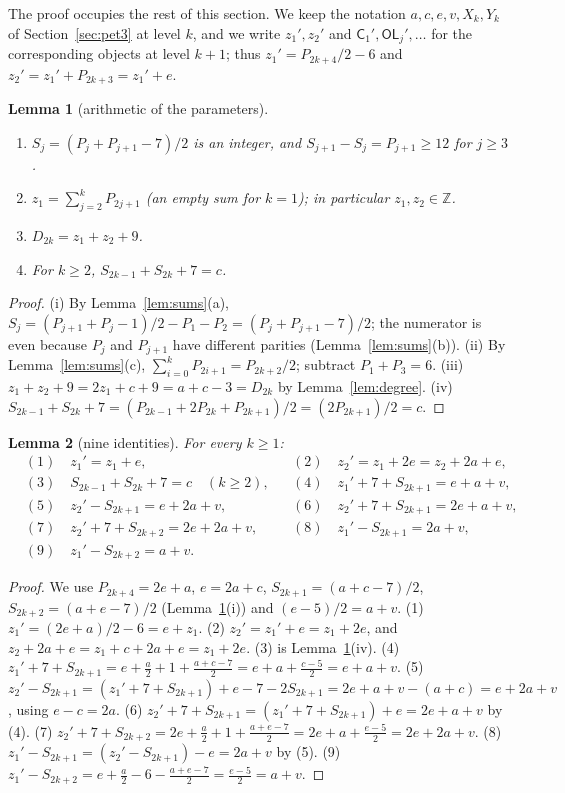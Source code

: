 \documentclass[11pt]{amsart}
\newtheorem{lemma}{Lemma}[section]
\theoremstyle{definition}
\theoremstyle{remark}
\theoremstyle{plain}
\numberwithin{equation}{section}
\newcommand{\Z}{\mathbb{Z}}
\newcommand{\CC}{\mathsf{C}}
\newcommand{\OL}{\mathsf{OL}}
\begin{document}
The proof occupies the rest of this section. We keep the notation $a,c,e,v,X_k,Y_k$ of
Section~\ref{sec:pet3} at level $k$, and we write $z_1',z_2'$ and $\CC_1',\OL_j',\dots$ for the
corresponding objects at level $k+1$; thus $z_1'=P_{2k+4}/2-6$ and $z_2'=z_1'+P_{2k+3}=z_1'+e$.

\begin{lemma}[arithmetic of the parameters]\label{lem:arith}
\begin{enumerate}[label=\textup{(\roman*)}]
\item $S_j=(P_j+P_{j+1}-7)/2$ is an integer, and $S_{j+1}-S_j=P_{j+1}\ge12$ for $j\ge3$.
\item $z_1=\sum_{j=2}^{k}P_{2j+1}$ (an empty sum for $k=1$); in particular $z_1,z_2\in\Z$.
\item $D_{2k}=z_1+z_2+9$.
\item For $k\ge2$, $S_{2k-1}+S_{2k}+7=c$.
\end{enumerate}
\end{lemma}

\begin{proof}
(i) By Lemma~\ref{lem:sums}(a), $S_j=(P_{j+1}+P_j-1)/2-P_1-P_2=(P_j+P_{j+1}-7)/2$; the numerator is
even because $P_j$ and $P_{j+1}$ have different parities (Lemma~\ref{lem:sums}(b)).
(ii) By Lemma~\ref{lem:sums}(c), $\sum_{i=0}^{k}P_{2i+1}=P_{2k+2}/2$; subtract $P_1+P_3=6$.
(iii) $z_1+z_2+9=2z_1+c+9=a+c-3=D_{2k}$ by Lemma~\ref{lem:degree}.
(iv) $S_{2k-1}+S_{2k}+7=(P_{2k-1}+2P_{2k}+P_{2k+1})/2=(2P_{2k+1})/2=c$.
\end{proof}

\begin{lemma}[nine identities]\label{lem:nine}
For every $k\ge1$:
\begin{align*}
&(1)\quad z_1'=z_1+e, &&(2)\quad z_2'=z_1+2e=z_2+2a+e,\\
&(3)\quad S_{2k-1}+S_{2k}+7=c\quad(k\ge2), &&(4)\quad z_1'+7+S_{2k+1}=e+a+v,\\
&(5)\quad z_2'-S_{2k+1}=e+2a+v, &&(6)\quad z_2'+7+S_{2k+1}=2e+a+v,\\
&(7)\quad z_2'+7+S_{2k+2}=2e+2a+v, &&(8)\quad z_1'-S_{2k+1}=2a+v,\\
&(9)\quad z_1'-S_{2k+2}=a+v.
\end{align*}
\end{lemma}

\begin{proof}
We use $P_{2k+4}=2e+a$, $e=2a+c$, $S_{2k+1}=(a+c-7)/2$, $S_{2k+2}=(a+e-7)/2$ (Lemma~\ref{lem:arith}(i))
and $(e-5)/2=a+v$.
(1) $z_1'=(2e+a)/2-6=e+z_1$.
(2) $z_2'=z_1'+e=z_1+2e$, and $z_2+2a+e=z_1+c+2a+e=z_1+2e$.
(3) is Lemma~\ref{lem:arith}(iv).
(4) $z_1'+7+S_{2k+1}=e+\tfrac a2+1+\tfrac{a+c-7}{2}=e+a+\tfrac{c-5}{2}=e+a+v$.
(5) $z_2'-S_{2k+1}=(z_1'+7+S_{2k+1})+e-7-2S_{2k+1}=2e+a+v-(a+c)=e+2a+v$, using $e-c=2a$.
(6) $z_2'+7+S_{2k+1}=(z_1'+7+S_{2k+1})+e=2e+a+v$ by (4).
(7) $z_2'+7+S_{2k+2}=2e+\tfrac a2+1+\tfrac{a+e-7}{2}=2e+a+\tfrac{e-5}{2}=2e+2a+v$.
(8) $z_1'-S_{2k+1}=(z_2'-S_{2k+1})-e=2a+v$ by (5).
(9) $z_1'-S_{2k+2}=e+\tfrac a2-6-\tfrac{a+e-7}{2}=\tfrac{e-5}{2}=a+v$.
\end{proof}
\end{document}

